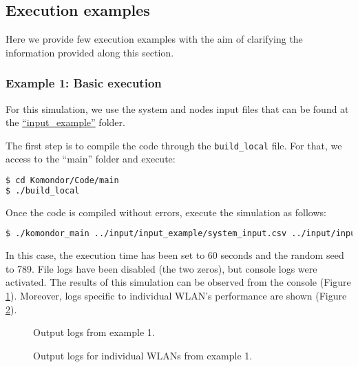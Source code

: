 \documentclass[a4paper]{article}
\begin{document}
\subsection{Execution examples}
\label{section:examples}
Here we provide few execution examples with the aim of clarifying the information provided along this section.

\subsubsection{Example 1: Basic execution}
For this simulation, we use the system and nodes input files that can be found at the \href{https://github.com/wn-upf/Komondor/tree/master/Code/input/input_example}{``input\_example''} folder.

The first step is to compile the code through the \texttt{build\_local} file. For that, we access to the ``main'' folder and execute:
\begin{lstlisting}[language=bash]
$ cd Komondor/Code/main
$ ./build_local
\end{lstlisting}

Once the code is compiled without errors, execute the simulation as follows:
\begin{lstlisting}[language=bash]
$ ./komondor_main ../input/input_example/system_input.csv ../input/input_example/nodes_input.csv 0 0 1 1 60 789
\end{lstlisting}

In this case, the execution time has been set to 60 seconds and the random seed to 789. File logs have been disabled (the two zeros), but console logs were activated. The results of this simulation can be observed from the console (Figure \ref{fig:example_1_console_output}). Moreover, logs specific to individual WLAN's performance are shown (Figure \ref{fig:example_1_console_output_wlans}).

\begin{figure}[h!]
	\centering
	\caption{Output logs from example 1.}
	\label{fig:example_1_console_output}
\end{figure}

\begin{figure}[h!]
	\centering
	\caption{Output logs for individual WLANs from example 1.}
	\label{fig:example_1_console_output_wlans}
\end{figure}
\end{document}
